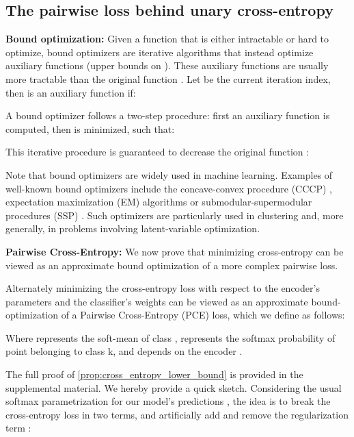 \documentclass[runningheads]{llncs}
\begin{document}
\subsection{The pairwise loss behind unary cross-entropy}\label{sec:cross_entropy_explicit}

\textbf{Bound optimization:}
Given a function  that is either intractable or hard to optimize, bound optimizers are iterative algorithms that instead optimize
auxiliary functions (upper bounds on ). These auxiliary functions are usually more tractable than the
original function . Let  be the current iteration index, then  is an auxiliary function if:

A bound optimizer follows a two-step procedure: first an auxiliary function  is computed, then  is minimized, such that:

This iterative procedure is guaranteed to decrease the original function :

Note that bound optimizers are widely used in machine learning. Examples of well-known bound optimizers include the concave-convex procedure (CCCP) \cite{cccp}, expectation maximization (EM) algorithms or submodular-supermodular procedures (SSP) \cite{ssp}. Such optimizers are particularly used in clustering \cite{tang2015kernel} and, more generally, in problems involving latent-variable optimization.
 
\textbf{Pairwise Cross-Entropy:} We now prove that  minimizing cross-entropy can be viewed as an approximate bound optimization of a more complex pairwise loss. 
\begin{proposition}\label{prop:cross_entropy_lower_bound}
Alternately minimizing the cross-entropy loss  with respect to the encoder's parameters  and the classifier's weights  can be viewed as an approximate bound-optimization of a Pairwise Cross-Entropy (PCE) loss, which we define as follows:

Where  represents the soft-mean of class ,  represents the softmax probability of point  belonging to class k, and  depends on the encoder .
\end{proposition}



The full proof of \autoref{prop:cross_entropy_lower_bound} is provided in the supplemental material. We hereby provide a quick sketch. 
Considering the usual softmax parametrization for our model's predictions , the idea is to break the cross-entropy loss in two terms, and artificially add and remove the regularization term :
\end{document}
